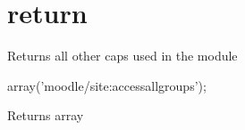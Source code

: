 \hypertarget{return-example}{\section{return}
}
Returns all other caps used in the module

array('moodle/site\-:accessallgroups'); \begin{DoxyReturn}{Returns}
array
\end{DoxyReturn}

\begin{DoxyCodeInclude}
\end{DoxyCodeInclude}
 